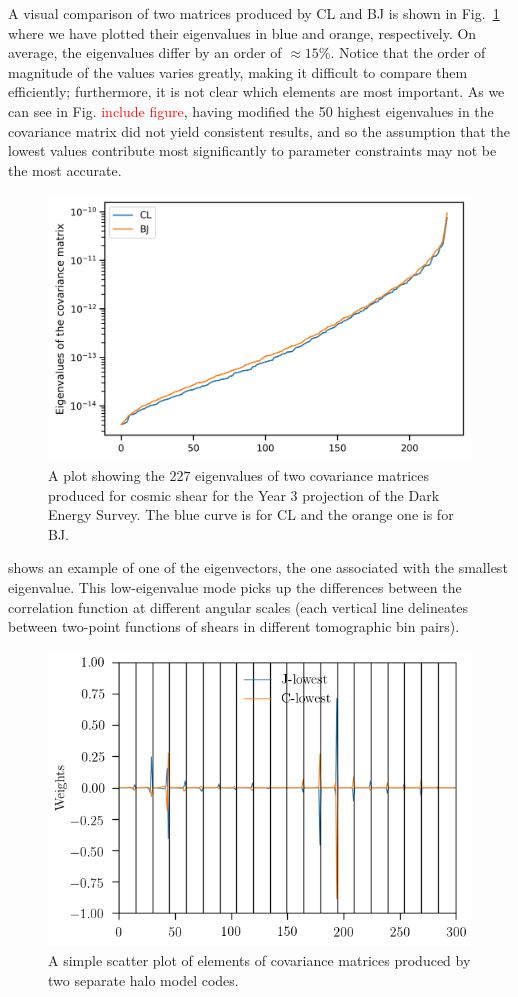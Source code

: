 \documentclass[twocolumn]{\docclass}
\newcommand{\rf}[1]{\ref{fig:#1}}
\begin{document}
A visual comparison of two matrices produced by CL and BJ is shown in Fig.~\rf{coveigen} where we have plotted their eigenvalues in blue and orange, respectively. On average, the eigenvalues differ by an order of $\approx 15 \%$. Notice that the order of magnitude of the values varies greatly, making it difficult to compare them efficiently; furthermore, it is not clear which elements are most important. As we can see in Fig. \textcolor{red}{include figure}, having modified the 50 highest eigenvalues in the covariance matrix did not yield consistent results, and so the assumption that the lowest values contribute most significantly to parameter constraints may not be the most accurate.

\begin{figure}
\includegraphics[width=0.9\columnwidth]{coveigen_BJ-CL.png}
\caption{A plot showing the $227$ eigenvalues of two covariance matrices produced for cosmic shear for the Year 3 projection of the Dark Energy Survey. The blue curve is for CL and the orange one is for BJ. \label{fig:coveigen}}
\end{figure}

 shows an example of one of the eigenvectors, the one associated with the smallest eigenvalue. This low-eigenvalue mode picks up the differences between the correlation function at different angular scales (each vertical line delineates between two-point functions of shears in different tomographic bin pairs).

\begin{figure}
\includegraphics[width=0.9\columnwidth]{evector.png}
\caption{A simple scatter plot of elements of covariance matrices produced by two separate halo model codes. \label{fig:evector}}
\end{figure}
\end{document}
